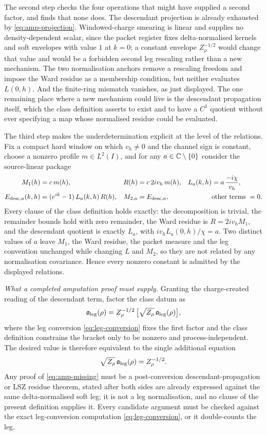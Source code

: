 The second step checks the four operations that might have supplied a second
factor, and finds that none does. The descendant projection is already
exhausted by \eqref{eq:amp-projection}. Windowed-charge smearing is linear and
supplies no density-dependent scalar, since the packet register fixes
delta-normalised kernels and soft envelopes with value $1$ at $k=0$; a
constant envelope $Z_\rho^{-1/2}$ would change that value and would be a
forbidden second leg rescaling rather than a new mechanism. The two
normalisation anchors remove a rescaling freedom and impose the Ward residue
as a membership condition, but neither evaluates $L(0,h)$. And the finite-ring
mismatch vanishes, as just displayed. The one remaining place where a new
mechanism could live is the descendant propagation itself, which the class
definition asserts to exist and to have a $C^1$ quotient without ever
specifying a map whose normalised residue could be evaluated.

The third step makes the underdetermination explicit at the level of the
relations. Fix a compact hard window on which $v_h \neq 0$ and the channel
sign is constant, choose a nonzero profile $m \in L^2(I)$, and for any
$a \in \mathbb{C}\setminus\{0\}$ consider the source-linear package
\begin{align}
  M_1(h) &= c\,m(h), &
  R(h) &= c\,2iv_h\,m(h), &
  L_a(k,h) &= a\,\frac{-i\chi}{v_h}, \notag\\
  E_{\mathrm{desc},a}(k,h) &= (e^{ik}-1)\,L_a(k,h)\,R(h), &
  M_{2,a} &= E_{\mathrm{desc},a}, &
  &\text{other terms } = 0 .
\end{align}
Every clause of the class definition holds exactly: the decomposition is
trivial, the remainder bounds hold with zero remainder, the Ward residue is
$R = 2iv_h M_1$, and the descendant quotient is exactly $L_a$, with
$iv_h L_a(0,h)/\chi = a$. Two distinct values of $a$ leave $M_1$, the Ward
residue, the packet measure and the leg convention unchanged while changing
$L$ and $M_2$, so they are not related by any normalisation covariance. Hence
every nonzero constant is admitted by the displayed relations.

\emph{What a completed amputation proof must supply.} Granting the
charge-created reading of the descendant term, factor the class datum as
\begin{equation}
  \mathfrak{a}_{\mathrm{leg}}(\rho) = Z_\rho^{-1/2}\,\bigl[\sqrt{Z_\rho}\,\mathfrak{a}_{\mathrm{leg}}(\rho)\bigr] ,
\end{equation}
where the leg conversion \eqref{eq:leg-conversion} fixes the first factor and
the class definition constrains the bracket only to be nonzero and
process-independent. The desired value is therefore equivalent to the single
additional equation
\begin{equation}
  \sqrt{Z_\rho}\,\mathfrak{a}_{\mathrm{leg}}(\rho) = Z_\rho^{-1/2} .
  \label{eq:amp-missing}
\end{equation}
Any proof of \eqref{eq:amp-missing} must be a post-conversion
descendant-propagation or LSZ residue theorem, stated after both sides are
already expressed against the same delta-normalised soft leg; it is not a leg
normalisation, and no clause of the present definition supplies it. Every
candidate argument must be checked against the exact leg-conversion
computation \eqref{eq:leg-conversion}, or it double-counts the leg.


